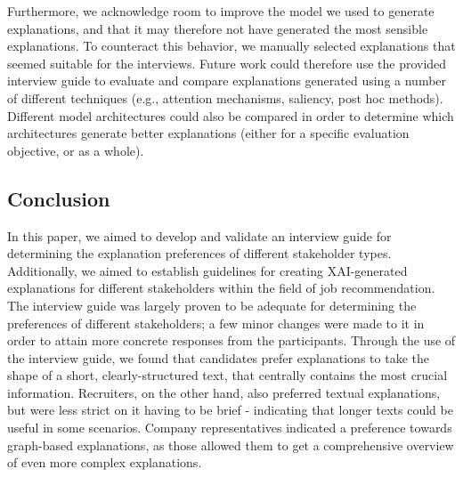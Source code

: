 Furthermore, we acknowledge room to improve the model we used to generate explanations, and that it may therefore not have generated the most sensible explanations. To counteract this behavior, we manually selected explanations that seemed suitable for the interviews. %
Future work could therefore use the provided interview guide to evaluate and compare explanations generated using a number of different techniques (e.g., attention mechanisms, saliency, post hoc methods). Different model architectures could also be compared in order to determine which architectures generate better explanations (either for a specific evaluation objective, or as a whole). 


\subsection{Conclusion}
In this paper, we aimed to develop and validate an interview guide for determining the explanation preferences of different stakeholder types. Additionally, we aimed to establish guidelines for creating XAI-generated explanations for different stakeholders within the field of job recommendation. The interview guide was largely proven to be adequate for determining the preferences of different stakeholders; a few minor changes were made to it in order to attain more concrete responses from the participants. Through the use of the interview guide, we found that candidates prefer explanations to take the shape of a short, clearly-structured text, that centrally contains the most crucial information. Recruiters, on the other hand, also preferred textual explanations, but were less strict on it having to be brief - indicating that longer texts could be useful in some scenarios. Company representatives indicated a preference towards graph-based explanations, as those allowed them to get a comprehensive overview of even more complex explanations. 